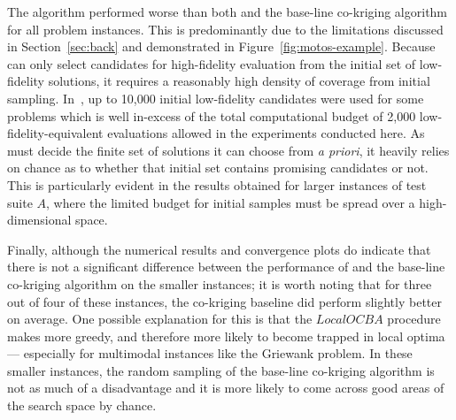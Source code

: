 The \motos{} algorithm performed worse than both \AlgName{} and the base-line co-kriging algorithm for all problem instances. This is predominantly due to the limitations discussed in Section~\ref{sec:back} and demonstrated in Figure~\ref{fig:motos-example}. Because \motos{} can only select candidates for high-fidelity evaluation from the initial set of low-fidelity solutions, it requires a reasonably high density of coverage from initial sampling. In~\cite{xu2016mo2tos}, up to 10,000 initial low-fidelity candidates were used for some problems which is well in-excess of the total computational budget of 2,000 low-fidelity-equivalent evaluations allowed in the experiments conducted here. As \motos{} must decide the finite set of solutions it can choose from \emph{a priori}, it heavily relies on chance as to whether that initial set contains promising candidates or not. This is particularly evident in the results obtained for larger instances of test suite $A$, where the limited budget for initial samples must be spread over a high-dimensional space.

Finally, although the numerical results and convergence plots do indicate that there is not a significant difference between the performance of \AlgName{} and the base-line co-kriging algorithm on the smaller instances; it is worth noting that for three out of four of these instances, the co-kriging baseline did perform slightly better on average. One possible explanation for this is that the $LocalOCBA$ procedure makes \AlgName{} more greedy, and therefore more likely to become trapped in local optima --- especially for multimodal instances like the Griewank problem. In these smaller instances, the random sampling of the base-line co-kriging algorithm is not as much of a disadvantage and it is more likely to come across good areas of the search space by chance.